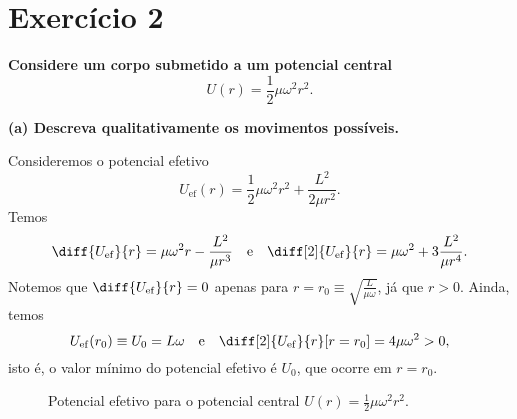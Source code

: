 \section*{Exercício 2}

\textbf{Considere um corpo submetido a um potencial central}
    \begin{equation*}
        U(r) = \frac12 \mu \omega^2r^2.
    \end{equation*}

\textbf{(a) Descreva qualitativamente os movimentos possíveis. }

Consideremos o potencial efetivo
\begin{equation}
    U_\mathrm{ef}(r) = \frac{1}{2}\mu\omega^2 r^2 + \frac{L^2}{2\mu r^2}.
\end{equation}
Temos
\begin{equation}
    \diff{U_\mathrm{ef}}{r} = \mu\omega^2 r - \frac{L^2}{\mu r^3}\quad\text{e}\quad\diff[2]{U_\mathrm{ef}}{r} = \mu\omega^2 + 3\frac{L^2}{\mu r^4}.
\end{equation}
Notemos que \(\diff{U_\mathrm{ef}}{r} = 0\) apenas para \(r = r_0 \equiv \sqrt{\frac{L}{\mu\omega}}\), já que \(r > 0\). Ainda, temos
\begin{equation}
    U_\mathrm{ef}(r_0) \equiv U_0 = L\omega\quad\text{e}\quad\diff[2]{U_\mathrm{ef}}{r}[r=r_0] = 4\mu\omega^2 > 0,
\end{equation}
isto é, o valor mínimo do potencial efetivo é \(U_0\), que ocorre em \(r = r_0\).

\begin{figure}[h]
    \centering
    \caption{Potencial efetivo para o potencial central \(U(r) = \frac12 \mu\omega^2r^2\).}
\end{figure}


